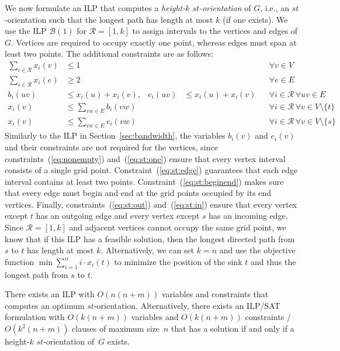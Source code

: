 \documentclass[runningheads]{llncs}
\newcounter{constr}
\begin{document}
We now formulate an ILP that computes a \emph{height-$k$
$st$-orientation} of $G$, i.e., an $st$-orientation such that the
longest path has length at most $k$ (if one exists).
We use the ILP $\mathcal B(1)$ for $\mathcal R = [1,k]$ to assign
intervals to the vertices and edges of $G$. Vertices are required to
occupy exactly one point, whereas edges must span at least two points.
The additional constraints are as follows:
\begin{align}
  \label{eq:st:one} \sum_{i \in \mathcal R} x_{i}(v) &\le 1 &&&&
\forall v \in V\\
  \label{eq:st:edge} \sum_{i \in \mathcal R} x_i(e) &\ge 2 &&&&
\forall e \in E\\
  \label{eq:st:beginend} b_i(uv) &\le x_i(u) + x_i(v), & e_i(uv)&\le
x_i(u) + x_i(v) && \forall i \in \mathcal R\, \forall uv \in E \\
  \label{eq:st:out} x_i(v) &\le \sum_{vw \in E} b_i(vw) &&&& \forall i
\in \mathcal R \, \forall v \in V\setminus\{t\}\\
  \label{eq:st:in} x_i(v) &\le \sum_{vw \in E} e_i(vw) &&&& \forall i
\in \mathcal R \, \forall v \in V\setminus\{s\}
\end{align}
Similarly to the ILP in Section~\ref{sec:bandwidth}, the variables
$b_i(v)$ and $e_i(v)$ and their constraints are not required for the
vertices, since constraints~(\ref{eq:nonempty})
and~(\ref{eq:st:one}) ensure that every vertex interval consists of a
single grid point. Constraint~(\ref{eq:st:edge}) guarantees that each
edge interval contains at least two points.
Constraint~(\ref{eq:st:beginend}) makes sure that every edge must
begin and end at the grid points occupied by its end vertices.
Finally, constraints~(\ref{eq:st:out}) and~(\ref{eq:st:in}) ensure
that every vertex except $t$ has an outgoing edge and every vertex
except $s$ has an incoming edge. Since $\mathcal R = [1,k]$ and
adjacent vertices cannot occupy the same grid point, we know that if
this ILP has a feasible solution, then the longest directed path from
$s$ to $t$ has length at most $k$. Alternatively, we can set $k=n$ and
use the objective function $\min \sum_{i=1}^n i\cdot x_i(t)$ to
minimize the position of the sink $t$ and thus the longest path from
$s$ to $t$.

\begin{theorem}
There exists an ILP with $O(n(n+m))$ variables
and constraints that computes an optimum $st$-orientation. 
Alternatively, there exists an ILP/SAT formulation with $O(k(n+m))$
variables and $O(k(n+m))$ constraints / $O(k^2(n+m))$ clauses of
maximum size~$n$ that has a solution if and only if a height-$k$
$st$-orientation of~$G$ exists. 
\end{theorem}
\end{document}
